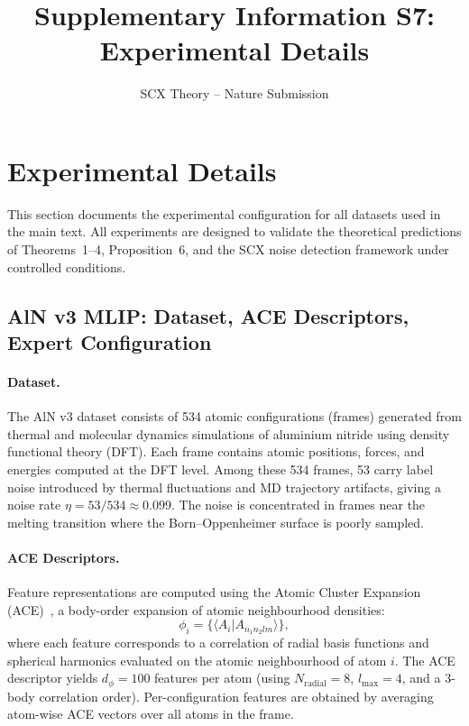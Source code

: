 \documentclass[article]{amsart}
\title{Supplementary Information S7: Experimental Details}
\author{SCX Theory -- Nature Submission}
\theoremstyle{definition}
\begin{document}
\maketitle

\section{Experimental Details}

This section documents the experimental configuration for all datasets used in the main text. All experiments are designed to validate the theoretical predictions of Theorems~1--4, Proposition~6, and the SCX noise detection framework under controlled conditions.

\subsection{AlN v3 MLIP: Dataset, ACE Descriptors, Expert Configuration}

\paragraph{Dataset.}
The AlN v3 dataset consists of 534 atomic configurations (frames) generated from thermal and molecular dynamics simulations of aluminium nitride using density functional theory (DFT). Each frame contains atomic positions, forces, and energies computed at the DFT level. Among these 534 frames, 53 carry label noise introduced by thermal fluctuations and MD trajectory artifacts, giving a noise rate $\eta = 53/534 \approx 0.099$. The noise is concentrated in frames near the melting transition where the Born--Oppenheimer surface is poorly sampled.

\paragraph{ACE Descriptors.}
Feature representations are computed using the Atomic Cluster Expansion (ACE)~\cite{drautz2019ace}, a body-order expansion of atomic neighbourhood densities:
\begin{equation}
\phi_i = \bigl\{ \langle A_i | A_{n_1 n_2 l m} \rangle \bigr\},
\end{equation}
where each feature corresponds to a correlation of radial basis functions and spherical harmonics evaluated on the atomic neighbourhood of atom $i$. The ACE descriptor yields $d_\phi = 100$ features per atom (using $N_{\text{radial}} = 8$, $l_{\max} = 4$, and a 3-body correlation order). Per-configuration features are obtained by averaging atom-wise ACE vectors over all atoms in the frame.
\end{document}
